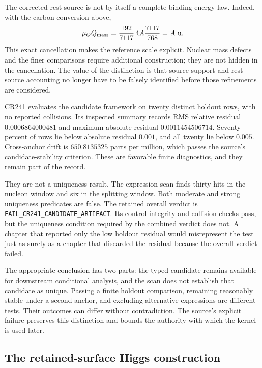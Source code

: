 The corrected rest-source is not by itself a complete binding-energy law. Indeed, with the carbon conversion above,
\begin{equation}
\mu_Q Q_{\rm mass}
=\frac{192}{7117}\,4A\frac{7117}{768}
=A\ \mathrm u.
\end{equation}
This exact cancellation makes the reference scale explicit. Nuclear mass defects and the finer comparisons require additional construction; they are not hidden in the cancellation. The value of the distinction is that source support and rest-source accounting no longer have to be falsely identified before those refinements are considered.

CR241 evaluates the candidate framework on twenty distinct holdout rows, with no reported collisions. Its inspected summary records RMS relative residual $0.0006864000481$ and maximum absolute residual $0.0011454506714$. Seventy percent of rows lie below absolute residual $0.001$, and all twenty lie below $0.005$. Cross-anchor drift is $650.8135325$ parts per million, which passes the source's candidate-stability criterion. These are favorable finite diagnostics, and they remain part of the record.\cite{viicr241}

They are not a uniqueness result. The expression scan finds thirty hits in the nucleon window and six in the splitting window. Both moderate and strong uniqueness predicates are false. The retained overall verdict is \texttt{FAIL\_CR241\_CANDIDATE\_ARTIFACT}. Its control-integrity and collision checks pass, but the uniqueness condition required by the combined verdict does not. A chapter that reported only the low holdout residual would misrepresent the test just as surely as a chapter that discarded the residual because the overall verdict failed.

The appropriate conclusion has two parts: the typed candidate remains available for downstream conditional analysis, and the scan does not establish that candidate as unique. Passing a finite holdout comparison, remaining reasonably stable under a second anchor, and excluding alternative expressions are different tests. Their outcomes can differ without contradiction. The source's explicit failure preserves this distinction and bounds the authority with which the kernel is used later.

\subsection{The retained-surface Higgs construction}

